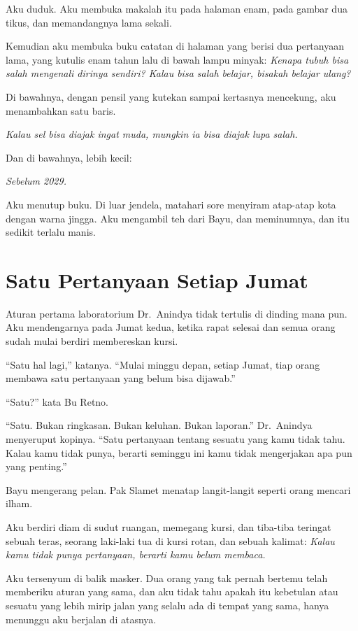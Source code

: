 \documentclass[11pt,twoside,openany]{book}
\begin{document}
Aku duduk. Aku membuka makalah itu pada halaman enam, pada gambar dua tikus, dan memandangnya lama sekali.

Kemudian aku membuka buku catatan di halaman yang berisi dua pertanyaan lama, yang kutulis enam tahun lalu di bawah lampu minyak: \emph{Kenapa tubuh bisa salah mengenali dirinya sendiri? Kalau bisa salah belajar, bisakah belajar ulang?}

Di bawahnya, dengan pensil yang kutekan sampai kertasnya mencekung, aku menambahkan satu baris.

\emph{Kalau sel bisa diajak ingat muda, mungkin ia bisa diajak lupa salah.}

Dan di bawahnya, lebih kecil:

\emph{Sebelum 2029.}

Aku menutup buku. Di luar jendela, matahari sore menyiram atap-atap kota dengan warna jingga. Aku mengambil teh dari Bayu, dan meminumnya, dan itu sedikit terlalu manis.

\chapter{Satu Pertanyaan Setiap Jumat}
Aturan pertama laboratorium Dr.~Anindya tidak tertulis di dinding mana pun. Aku mendengarnya pada Jumat kedua, ketika rapat selesai dan semua orang sudah mulai berdiri membereskan kursi.

``Satu hal lagi,'' katanya. ``Mulai minggu depan, setiap Jumat, tiap orang membawa satu pertanyaan yang belum bisa dijawab.''

``Satu?'' kata Bu Retno.

``Satu. Bukan ringkasan. Bukan keluhan. Bukan laporan.'' Dr.~Anindya menyeruput kopinya. ``Satu pertanyaan tentang sesuatu yang kamu tidak tahu. Kalau kamu tidak punya, berarti seminggu ini kamu tidak mengerjakan apa pun yang penting.''

Bayu mengerang pelan. Pak Slamet menatap langit-langit seperti orang mencari ilham.

Aku berdiri diam di sudut ruangan, memegang kursi, dan tiba-tiba teringat sebuah teras, seorang laki-laki tua di kursi rotan, dan sebuah kalimat: \emph{Kalau kamu tidak punya pertanyaan, berarti kamu belum membaca.}

Aku tersenyum di balik masker. Dua orang yang tak pernah bertemu telah memberiku aturan yang sama, dan aku tidak tahu apakah itu kebetulan atau sesuatu yang lebih mirip jalan yang selalu ada di tempat yang sama, hanya menunggu aku berjalan di atasnya.
\end{document}
